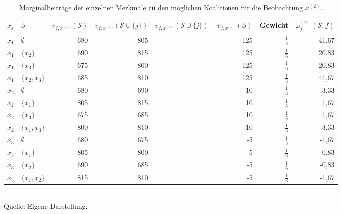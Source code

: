\begin{table}[h]
    \caption{Marginalbeiträge der einzelnen Merkmale zu den möglichen Koalitionen für die Beobachtung $x^{(2)}$.}
    \footnotesize
    \begin{tabularx}{\textwidth}{XXrrrrr}
    \toprule
    $x_{j}$ & $\mathcal{S}$ & $v_{f, x^{(2)}}(\mathcal{S})$ & $v_{f, x^{(2)}}(\mathcal{S} \cup \{j\})$ & $v_{f, x^{(2)}}(\mathcal{S} \cup \{j\}) - v_{f, x^{(2)}}(\mathcal{S})$ & Gewicht & $\varphi_{j}^{(2)}(\mathcal{S}, f)$\\
    \midrule
    $x_1$ & $\emptyset$ & 680 & 805 & 125 & $\frac{1}{3}$ & 41,67 \\
    $x_1$ & $\{x_2\}$ & 690 & 815 & 125 & $\frac{1}{6}$ & 20.83 \\
    $x_1$ & $\{x_3\}$ & 675 & 800 & 125 & $\frac{1}{6}$ & 20.83 \\
    $x_1$ & $\{x_2, x_3\}$ & 685 & 810 & 125 & $\frac{1}{3}$ & 41,67 \\
    $x_2$ & $\emptyset$ & 680 & 690 & 10 & $\frac{1}{3}$ & 3,33 \\
    $x_2$ & $\{x_1\}$ & 805 & 815 & 10 & $\frac{1}{6}$ & 1,67 \\
    $x_2$ & $\{x_3\}$ & 675 & 685 & 10 & $\frac{1}{6}$ & 1,67 \\
    $x_2$ & $\{x_1, x_3\}$ & 800 & 810 & 10 & $\frac{1}{3}$ & 3,33 \\
    $x_3$ & $\emptyset$ & 680 & 675 & -5 & $\frac{1}{3}$ & -1,67 \\
    $x_3$ & $\{x_1\}$ & 805 & 800 & -5 & $\frac{1}{6}$ & -0,83 \\
    $x_3$ & $\{x_2\}$ & 690 & 685 & -5 & $\frac{1}{6}$ & -0,83 \\
    $x_3$ & $\{x_1, x_2\}$ & 815 & 810 & -5 & $\frac{1}{3}$ & -1,67 \\
    \bottomrule
    \end{tabularx}
    \label{tab:shapley_marginal_features_x2}
    \normalsize\\
    Quelle: Eigene Darstellung.
\end{table}

